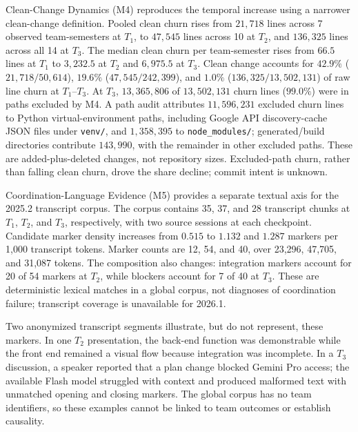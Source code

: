 Clean-Change Dynamics (M4) reproduces the temporal increase using a narrower
clean-change definition.
Pooled clean churn rises from $21{,}718$ lines across 7 observed team-semesters
at $T_1$, to $47{,}545$ lines across 10 at $T_2$, and $136{,}325$ lines across
all 14 at $T_3$. The median clean churn per team-semester rises from $66.5$
lines at $T_1$ to $3{,}232.5$ at $T_2$ and $6{,}975.5$ at $T_3$. Clean change
accounts for $42.9\%$ ($21{,}718/50{,}614$), $19.6\%$
($47{,}545/242{,}399$), and $1.0\%$ ($136{,}325/13{,}502{,}131$) of raw line
churn at $T_1$--$T_3$. At $T_3$, $13{,}365{,}806$ of $13{,}502{,}131$ churn
lines ($99.0\%$) were in paths excluded by M4. A path audit attributes
$11{,}596{,}231$ excluded churn lines to Python virtual-environment paths,
including Google API discovery-cache JSON files under \texttt{venv/}, and
$1{,}358{,}395$ to \texttt{node\_modules/}; generated/build directories
contribute $143{,}990$, with the remainder in other excluded paths. These are
added-plus-deleted changes, not repository sizes. Excluded-path churn, rather
than falling clean churn, drove the share decline; commit intent is unknown.

Coordination-Language Evidence (M5) provides a separate textual axis for the
2025.2 transcript corpus. The
corpus contains 35, 37, and 28 transcript chunks at $T_1$, $T_2$, and $T_3$,
respectively, with two source sessions at each checkpoint. Candidate marker
density increases from $0.515$ to $1.132$ and $1.287$ markers per 1,000
transcript tokens. Marker counts are 12, 54, and 40, over 23,296, 47,705,
and 31,087 tokens. The composition also changes: integration markers account
for 20 of 54 markers at $T_2$, while blockers account for 7 of 40 at $T_3$.
These are deterministic lexical matches in a global corpus, not diagnoses of
coordination failure; transcript coverage is unavailable for 2026.1.

Two anonymized transcript segments illustrate, but do not represent, these
markers. In one $T_2$ presentation, the back-end function was demonstrable
while the front end remained a visual flow because integration was incomplete.
In a $T_3$ discussion, a speaker reported that a plan change blocked Gemini Pro
access; the available Flash model struggled with context and produced malformed
text with unmatched opening and closing markers. The global corpus has no team
identifiers, so these examples cannot be linked to team outcomes or establish
causality.

